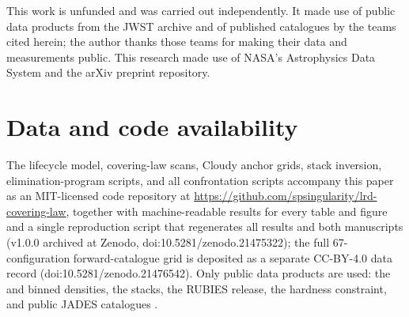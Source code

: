 \documentclass[twocolumn]{aastex631}
\begin{document}
\begin{acknowledgments}
This work is unfunded and was carried out independently. It made use of
public data products from the JWST archive and of published catalogues by
the teams cited herein; the author thanks those teams for making their
data and measurements public. This research made use of NASA's
Astrophysics Data System and the arXiv preprint repository.
\end{acknowledgments}


\section*{Data and code availability}
The lifecycle model, covering-law scans, Cloudy anchor grids, stack
inversion, elimination-program scripts, and all confrontation scripts
accompany this paper as an MIT-licensed code repository at
\url{https://github.com/spsingularity/lrd-covering-law}, together with
machine-readable results for every table and figure and a single
reproduction script that regenerates all results and both manuscripts
(v1.0.0 archived at Zenodo, doi:10.5281/zenodo.21475322); the full
67-configuration forward-catalogue grid
is deposited as a separate CC-BY-4.0 data record
(doi:10.5281/zenodo.21476542). Only
public data products are used: the \citet{Rinaldi2026} and \citet{Ma2026}
binned densities, the \citet{PerezGonzalez2026} stacks, the
\citet{Hviding2025} RUBIES release, the \citet{Sok2026} hardness
constraint, and public JADES catalogues \citep{Eisenstein2023}.

\end{document}
